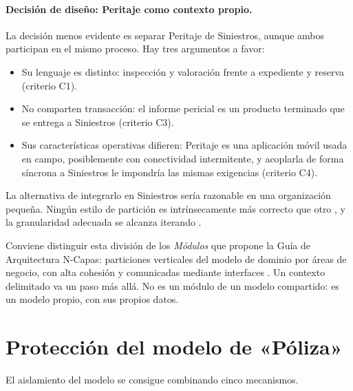 \paragraph{Decisión de diseño: Peritaje como contexto propio.}
La decisión menos evidente es separar Peritaje de Siniestros, aunque ambos participan en el
mismo proceso. Hay tres argumentos a favor:
\begin{itemize}
  \item Su lenguaje es distinto: inspección y valoración frente a expediente y reserva
        (criterio C1).
  \item No comparten transacción: el informe pericial es un producto terminado que se
        entrega a Siniestros (criterio C3).
  \item Sus características operativas difieren: Peritaje es una aplicación móvil usada
        en campo, posiblemente con conectividad intermitente, y acoplarla de forma
        síncrona a Siniestros le impondría las mismas exigencias (criterio C4).
\end{itemize}
La alternativa de integrarlo en Siniestros sería razonable en una organización pequeña.
Ningún estilo de partición es intrínsecamente más correcto que otro
\parencite[cap.~8]{richardsford2020}, y la granularidad adecuada se alcanza iterando
\parencite[cap.~17]{richardsford2020}.

Conviene distinguir esta división de los \emph{Módulos} que propone la Guía de
Arquitectura N-Capas: particiones verticales del modelo de dominio por áreas de negocio,
con alta cohesión y comunicadas mediante interfaces \parencite[71--72]{delatorre2010}. Un
contexto delimitado va un paso más allá. No es un módulo de un modelo compartido: es un
modelo propio, con sus propios datos.

\section{Protección del modelo de «Póliza»}
\label{sec:p3-contaminacion}

El aislamiento del modelo se consigue combinando cinco mecanismos.

